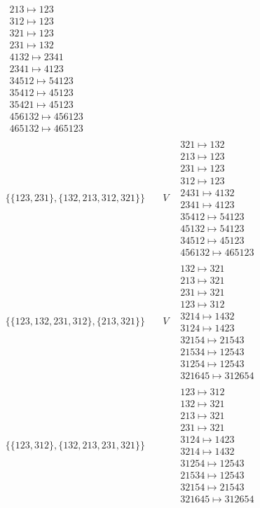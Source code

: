 \begin{tiny}
\begin{align}
\begin{matrix}
213 \mapsto 123\\312 \mapsto 123\\321 \mapsto 123\\231 \mapsto 132\\4132 \mapsto 2341\\2341 \mapsto 4123\\34512 \mapsto 54123\\35412 \mapsto 45123\\35421 \mapsto 45123\\456132 \mapsto 456123\\465132 \mapsto 465123
\end{matrix}
\\
\{\{123, 231\}, \{132, 213, 312, 321\}\}
\quad
&
V
&
\begin{matrix}
321 \mapsto 132\\213 \mapsto 123\\231 \mapsto 123\\312 \mapsto 123\\2431 \mapsto 4132\\2341 \mapsto 4123\\35412 \mapsto 54123\\45132 \mapsto 54123\\34512 \mapsto 45123\\456132 \mapsto 465123
\end{matrix}
\\
\{\{123, 132, 231, 312\}, \{213, 321\}\}
\quad
&
V
&
\begin{matrix}
132 \mapsto 321\\213 \mapsto 321\\231 \mapsto 321\\123 \mapsto 312\\3214 \mapsto 1432\\3124 \mapsto 1423\\32154 \mapsto 21543\\21534 \mapsto 12543\\31254 \mapsto 12543\\321645 \mapsto 312654
\end{matrix}
\\
\{\{123, 312\}, \{132, 213, 231, 321\}\}
\quad
&
\phantom{.}
&
\begin{matrix}
123 \mapsto 312\\132 \mapsto 321\\213 \mapsto 321\\231 \mapsto 321\\3124 \mapsto 1423\\3214 \mapsto 1432\\31254 \mapsto 12543\\21534 \mapsto 12543\\32154 \mapsto 21543\\321645 \mapsto 312654

\end{matrix}
\end{align}
\end{tiny}
